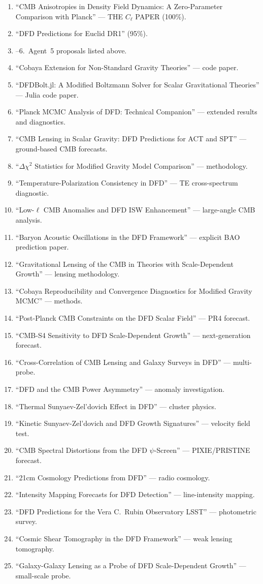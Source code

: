 \documentclass[11pt,a4paper]{article}
\begin{document}
\begin{enumerate}
\item ``CMB Anisotropies in Density Field Dynamics: A Zero-Parameter Comparison with Planck'' --- THE $C_\ell$ PAPER (100\%).
\item ``DFD Predictions for Euclid DR1'' (95\%).
\item--6.\ Agent~5 proposals listed above.
\item ``Cobaya Extension for Non-Standard Gravity Theories'' --- code paper.
\item ``DFDBolt.jl: A Modified Boltzmann Solver for Scalar Gravitational Theories'' --- Julia code paper.
\item ``Planck MCMC Analysis of DFD: Technical Companion'' --- extended results and diagnostics.
\item ``CMB Lensing in Scalar Gravity: DFD Predictions for ACT and SPT'' --- ground-based CMB forecasts.
\item ``$\Delta\chi^2$ Statistics for Modified Gravity Model Comparison'' --- methodology.
\item ``Temperature-Polarization Consistency in DFD'' --- TE cross-spectrum diagnostic.
\item ``Low-$\ell$ CMB Anomalies and DFD ISW Enhancement'' --- large-angle CMB analysis.
\item ``Baryon Acoustic Oscillations in the DFD Framework'' --- explicit BAO prediction paper.
\item ``Gravitational Lensing of the CMB in Theories with Scale-Dependent Growth'' --- lensing methodology.
\item ``Cobaya Reproducibility and Convergence Diagnostics for Modified Gravity MCMC'' --- methods.
\item ``Post-Planck CMB Constraints on the DFD Scalar Field'' --- PR4 forecast.
\item ``CMB-S4 Sensitivity to DFD Scale-Dependent Growth'' --- next-generation forecast.
\item ``Cross-Correlation of CMB Lensing and Galaxy Surveys in DFD'' --- multi-probe.
\item ``DFD and the CMB Power Asymmetry'' --- anomaly investigation.
\item ``Thermal Sunyaev-Zel'dovich Effect in DFD'' --- cluster physics.
\item ``Kinetic Sunyaev-Zel'dovich and DFD Growth Signatures'' --- velocity field test.
\item ``CMB Spectral Distortions from the DFD $\psi$-Screen'' --- PIXIE/PRISTINE forecast.
\item ``21cm Cosmology Predictions from DFD'' --- radio cosmology.
\item ``Intensity Mapping Forecasts for DFD Detection'' --- line-intensity mapping.
\item ``DFD Predictions for the Vera C.\ Rubin Observatory LSST'' --- photometric survey.
\item ``Cosmic Shear Tomography in the DFD Framework'' --- weak lensing tomography.
\item ``Galaxy-Galaxy Lensing as a Probe of DFD Scale-Dependent Growth'' --- small-scale probe.
\end{enumerate}
\end{document}
